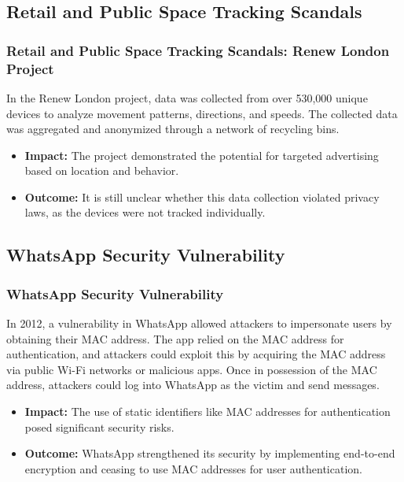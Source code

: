 \documentclass[
english,
svgnames,
notes=hide,
12pt]{beamer}
\begin{document}
\begin{frame}
  \section{Retail and Public Space Tracking Scandals}
  \frametitle{Retail and Public Space Tracking Scandals: Renew London Project}
  In the Renew London project, data was collected from over 530,000 unique devices to analyze movement 
  patterns, directions, and speeds. The collected data was aggregated and anonymized through a network 
  of recycling bins.
  \begin{itemize}
    \item \textbf{Impact:} The project demonstrated the potential for targeted advertising based on location and behavior. \pause
    \item \textbf{Outcome:} It is still unclear whether this data collection violated privacy laws, as the 
      devices were not tracked individually. 
  \end{itemize}
\end{frame}

\begin{frame}
  \section{WhatsApp Security Vulnerability}
  \frametitle{WhatsApp Security Vulnerability}
  In 2012, a vulnerability in WhatsApp allowed attackers to impersonate users by obtaining their MAC address. 
  The app relied on the MAC address for authentication, and attackers could exploit this by acquiring the MAC 
  address via public Wi-Fi networks or malicious apps. Once in possession of the MAC address, attackers could 
  log into WhatsApp as the victim and send messages.
  \begin{itemize}
    \item \textbf{Impact:} The use of static identifiers like MAC addresses for authentication posed 
      significant security risks. \pause
    \item \textbf{Outcome:} WhatsApp strengthened its security by implementing end-to-end encryption 
      and ceasing to use MAC addresses for user authentication. 
  \end{itemize}
\end{frame}
\end{document}
